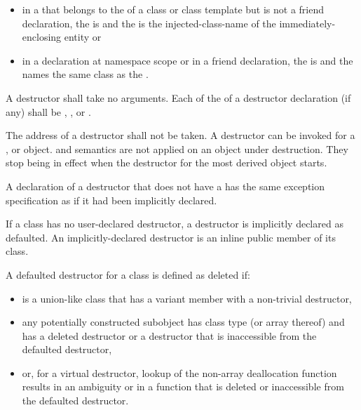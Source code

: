 \begin{itemize}
\item
in a  that belongs to the
 of a class or class template
but is not a friend
declaration, the  is
\tcode{\~} and the  is the
injected-class-name of the immediately-enclosing entity or

\item
in a declaration at namespace scope or in a friend declaration, the
 is 
\tcode{\~} and the  names the
same class as the .
\end{itemize}

A destructor shall take no arguments.
Each  of the 
of a destructor declaration (if any) shall be , , or
.

\pnum
{}%
The address of a destructor shall not be taken.
%
%
A destructor can be invoked for a
,
or
object.
and
semantics are not applied on an object under destruction.
They stop being in effect when the destructor for the
most derived object starts.

\pnum
\begin{note}
A declaration of a destructor that does not have a 
has the same exception specification as if it had been implicitly declared.
\end{note}

\pnum
{}%
%
If a class has no user-declared
destructor, a destructor is implicitly
declared as defaulted.
An implicitly-declared destructor is an
inline public member of its class.

\pnum
A defaulted destructor for a class
   is defined as deleted if:
\begin{itemize}
\item {} is a union-like class that has a variant
  member with a non-trivial destructor,

\item any potentially constructed subobject has class type
   (or array thereof) and
   has a deleted destructor or a destructor
  that is inaccessible from the defaulted destructor,

\item or, for a virtual destructor, lookup of the non-array deallocation
  function results in an ambiguity or in a function that is deleted or
  inaccessible from the defaulted destructor.
\end{itemize}

